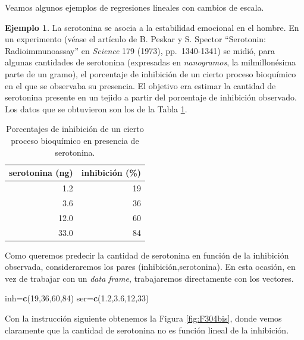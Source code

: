\documentclass[
]{book}
\newenvironment{Shaded}{\begin{snugshade}}{\end{snugshade}}
\newcommand{\DecValTok}[1]{\textcolor[rgb]{0.00,0.00,0.81}{#1}}
\newcommand{\FloatTok}[1]{\textcolor[rgb]{0.00,0.00,0.81}{#1}}
\newcommand{\KeywordTok}[1]{\textcolor[rgb]{0.13,0.29,0.53}{\textbf{#1}}}
\newcommand{\NormalTok}[1]{#1}
\theoremstyle{definition}
\theoremstyle{definition}
\newtheorem{example}{Ejemplo}[chapter]
\theoremstyle{definition}
\theoremstyle{remark}
\begin{document}
Veamos algunos ejemplos de regresiones lineales con cambios de escala.

\begin{example}
\protect\hypertarget{exm:reg3}{}{\label{exm:reg3} }La serotonina se asocia a la estabilidad emocional en el hombre. En un experimento (véase el artículo de B. Peskar y S. Spector ``Serotonin: Radioimmunoassay'' en \emph{Science} 179 (1973), pp.~1340-1341) se midió, para algunas cantidades de serotonina (expresadas en \emph{nanogramos}, la milmillonésima parte de un gramo), el porcentaje de inhibición de un cierto proceso bioquímico en el que se observaba su presencia. El objetivo era estimar la cantidad de serotonina presente en un tejido a partir del porcentaje de inhibición observado. Los datos que se obtuvieron son los de la Tabla \ref{tab:T4}.
\end{example}

\begin{table}

\caption{\label{tab:T4}Porcentajes de inhibición de un cierto proceso bioquímico en presencia de serotonina.}
\centering
\begin{tabular}[t]{rr}
\toprule
serotonina (ng) & inhibición (\%)\\
\midrule
1.2 & 19\\
3.6 & 36\\
12.0 & 60\\
33.0 & 84\\
\bottomrule
\end{tabular}
\end{table}

Como queremos predecir la cantidad de serotonina en función de la inhibición observada, consideraremos los pares (inhibición,serotonina). En esta ocasión, en vez de trabajar con un \emph{data frame}, trabajaremos directamente con los vectores.

\begin{Shaded}
\begin{Highlighting}[]
\NormalTok{inh=}\KeywordTok{c}\NormalTok{(}\DecValTok{19}\NormalTok{,}\DecValTok{36}\NormalTok{,}\DecValTok{60}\NormalTok{,}\DecValTok{84}\NormalTok{)}
\NormalTok{ser=}\KeywordTok{c}\NormalTok{(}\FloatTok{1.2}\NormalTok{,}\FloatTok{3.6}\NormalTok{,}\DecValTok{12}\NormalTok{,}\DecValTok{33}\NormalTok{)}
\end{Highlighting}
\end{Shaded}

Con la instrucción siguiente obtenemos la Figura \ref{fig:F304bis}, donde vemos claramente que la cantidad de serotonina no es función lineal de la inhibición.
\end{document}
